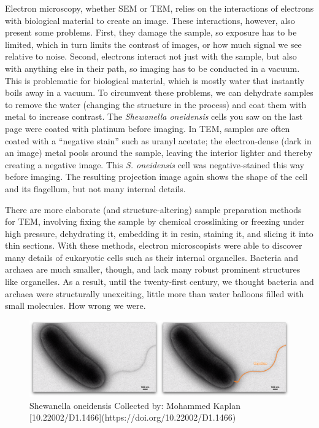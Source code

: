 \documentclass[]{tufte-book}
\begin{document}
Electron microscopy, whether SEM or TEM, relies on the interactions of
electrons with biological material to create an image. These
interactions, however, also present some problems. First, they damage
the sample, so exposure has to be limited, which in turn limits the
contrast of images, or how much signal we see relative to noise. Second,
electrons interact not just with the sample, but also with anything else
in their path, so imaging has to be conducted in a vacuum. This is
problematic for biological material, which is mostly water that
instantly boils away in a vacuum. To circumvent these problems, we can
dehydrate samples to remove the water (changing the structure in the
process) and coat them with metal to increase contrast. The
\emph{Shewanella oneidensis} cells you saw on the last page were coated
with platinum before imaging. In TEM, samples are often coated with a
``negative stain'' such as uranyl acetate; the electron-dense (dark in
an image) metal pools around the sample, leaving the interior lighter
and thereby creating a negative image. This \emph{S. oneidensis} cell
was negative-stained this way before imaging. The resulting projection
image again shows the shape of the cell and its flagellum, but not many
internal details.

There are more elaborate (and structure-altering) sample preparation
methods for TEM, involving fixing the sample by chemical crosslinking or
freezing under high pressure, dehydrating it, embedding it in resin,
staining it, and slicing it into thin sections. With these methods,
electron microscopists were able to discover many details of eukaryotic
cells such as their internal organelles. Bacteria and archaea are much
smaller, though, and lack many robust prominent structures like
organelles. As a result, until the twenty-first century, we thought
bacteria and archaea were structurally unexciting, little more than
water balloons filled with small molecules. How wrong we were.

\begin{figure}
\includegraphics{movie_stills/1_4} \caption[Shewanella oneidensis Collected by]{Shewanella oneidensis Collected by: Mohammed Kaplan [10.22002/D1.1466](https://doi.org/10.22002/D1.1466)}\label{fig:unnamed-chunk-7}
\end{figure}
\end{document}
